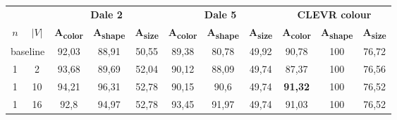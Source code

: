 \begin{table}[ht]
    \centering
    \begin{tabular}{cc|ccc|ccc|ccc}
        \toprule
                                      &         & \multicolumn{3}{c}{\textbf{Dale 2}} & \multicolumn{3}{c}{\textbf{Dale 5}} & \multicolumn{3}{c}{\textbf{CLEVR colour}}                                                                                                                                                                                                           \\  \cmidrule(lr){3-5}\cmidrule(lr){6-8}\cmidrule(lr){9-11}
        $n$                           & $|V|$   & \textbf{A\textsubscript{color}}     & \textbf{A\textsubscript{shape}}     & \textbf{A\textsubscript{size}}            & \textbf{A\textsubscript{color}} & \textbf{A\textsubscript{shape}} & \textbf{A\textsubscript{size}} & \textbf{A\textsubscript{color}} & \textbf{A\textsubscript{shape}} & \textbf{A\textsubscript{size}} \\\midrule
        \multicolumn{2}{c|}{baseline} & {92,03} & {88,91}                             & {50,55}                             & {89,38}                                   & {80,78}                         & {49,92}                         & {90,78}                        & {100}                           & {76,72}                                                          \\\midrule
        {1}                           & {2}     & {93,68}                             & {89,69}                             & {52,04}                                   & {90,12}                         & {88,09}                         & {49,74}                        & {87,37}                         & {100}                           & {76,56}                        \\
        {1}                           & {10}    & {94,21}                             & {96,31}                             & {52,78}                                   & {90,15}                         & {90,6}                          & {49,74}                        & \textbf{91,32}                  & {100}                           & {76,52}                        \\
        {1}                           & {16}    & {92,8}                              & {94,97}                             & {52,78}                                   & {93,45}                         & {91,97}                         & {49,74}                        & {91,03}                         & {100}                           & {76,52}                        \\

\end{tabular}
\end{table}
